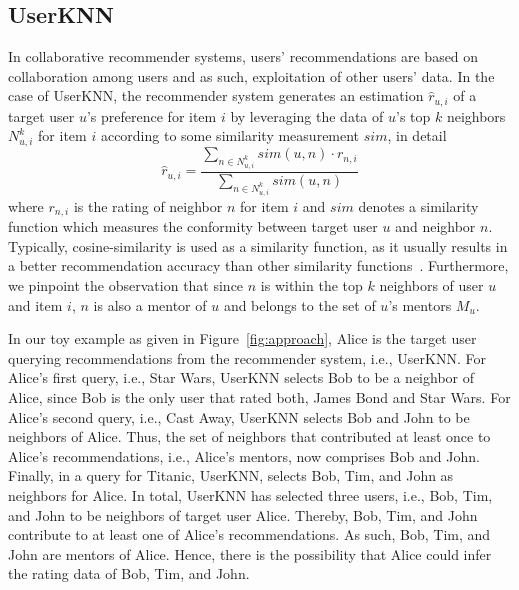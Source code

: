 \documentclass[manuscript,review,anonymous]{acmart}
\newcommand{\pmu}[1]{
        \textcolor{orange}{PM: #1}}
\begin{document}
\subsection{UserKNN}
\label{subsec:userknn}
In collaborative recommender systems, users' recommendations are based on collaboration among users and as such, exploitation of other users' data.
In the case of UserKNN, the recommender system generates an estimation $\hat{r}_{u, i}$ of a target user $u$'s preference for item $i$ by leveraging the data of $u$'s top $k$ neighbors $N^k_{u, i}$ for item $i$ according to some similarity measurement $sim$, in detail
\begin{equation}\label{eq:knn}
    \hat{r}_{u, i} = \frac{\sum_{n \in N^k_{u, i}} sim(u, n) \cdot r_{n, i}}{\sum_{n \in N^k_{u, i}} sim(u, n)}
\end{equation}
where $r_{n, i}$ is the rating of neighbor $n$ for item $i$ and $sim$ denotes a similarity function which measures the conformity between target user $u$ and neighbor $n$.
Typically, cosine-similarity is used as a similarity function, as it usually results in a better recommendation accuracy than other similarity functions~\cite{bagchi2015performance}.
Furthermore, we pinpoint the observation that since $n$ is within the top $k$ neighbors of user $u$ and item $i$, $n$ is also a mentor of $u$ and belongs to the set of $u$'s mentors $M_u$.

In our toy example as given in Figure~\ref{fig:approach}, Alice is the target user querying recommendations from the recommender system, i.e., UserKNN.
For Alice's first query, i.e., Star Wars, UserKNN selects Bob to be a neighbor of Alice, since Bob is the only user that rated both, James Bond and Star Wars.
For Alice's second query, i.e., Cast Away, UserKNN selects Bob and John to be neighbors of Alice.
Thus, the set of neighbors that contributed at least once to Alice's recommendations, i.e., Alice's mentors, now comprises Bob and John.
Finally, in a query for Titanic, UserKNN, selects Bob, Tim, and John as neighbors for Alice.
In total, UserKNN has selected three users, i.e., Bob, Tim, and John to be neighbors of target user Alice.
Thereby, Bob, Tim, and John contribute to at least one of Alice's recommendations.
As such, Bob, Tim, and John are mentors of Alice.
Hence, there is the possibility that Alice could infer the rating data of Bob, Tim, and John.
\end{document}
